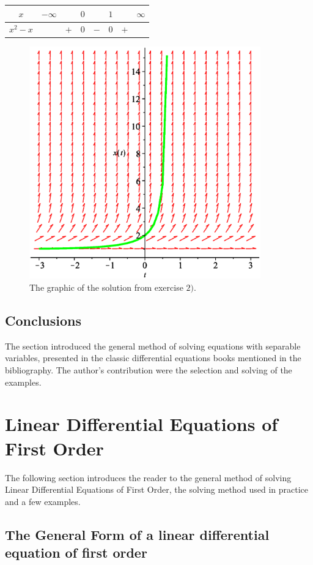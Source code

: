 \documentclass[a4paper,11pt]{report}
\begin{document}
\begin{center}
\begin{tabular}{c|c c c c c c c}
 $x$ & $-\infty$& & $0$ & &$1$ & &$\infty$\\
 \hline
 $x^{2}-x$ & &$+$& $0$& $-$& $0$ & $+$ &
\end{tabular}
\end{center}
\begin{figure}[h]
\caption{The graphic of the solution from exercise $2)$.}
\centering
 \includegraphics[width=10cm]{PortretEVS.eps}
\end{figure}

\subsection{Conclusions}
The section introduced the general method of solving equations with separable variables, presented in the classic differential equations books mentioned in the bibliography. The author's contribution were the selection and solving of the examples.




\section{Linear Differential Equations of First Order}

The following section introduces the reader to the general method of solving Linear Differential Equations of First Order, the solving method used in practice and a few examples.

\subsection{The General Form of a linear differential equation of first order}
\end{document}
